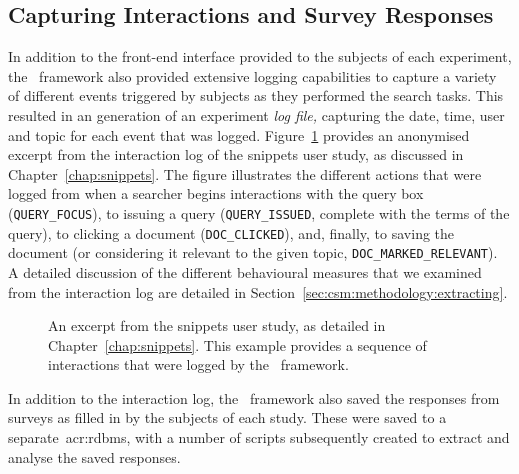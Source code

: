 \subsection{Capturing Interactions and Survey Responses}\label{sec:csm:methodology:user:capturing}
In addition to the front-end interface provided to the subjects of each experiment, the \treconomics~framework also provided extensive logging capabilities to capture a variety of different events triggered by subjects as they performed the search tasks. This resulted in an generation of an experiment \emph{log file,} capturing the date, time, user and topic for each event that was logged. Figure~\ref{fig:log} provides an anonymised excerpt from the interaction log of the snippets user study, as discussed in Chapter~\ref{chap:snippets}. The figure illustrates the different actions that were logged from when a searcher begins interactions with the query box (\texttt{QUERY\_FOCUS}), to issuing a query (\texttt{QUERY\_ISSUED}, complete with the terms of the query), to clicking a document (\texttt{DOC\_CLICKED}), and, finally, to saving the document (or considering it relevant to the given topic, \texttt{DOC\_MARKED\_RELEVANT}). A detailed discussion of the different behavioural measures that we examined from the interaction log are detailed in Section~\ref{sec:csm:methodology:extracting}.

\begin{figure}[t!]
    \centering
    \caption[Experiment log file excerpt]{An excerpt from the snippets user study, as detailed in Chapter~\ref{chap:snippets}. This example provides a sequence of interactions that were logged by the \treconomics~framework.}
    \label{fig:log}
\end{figure}

In addition to the interaction log, the \treconomics~framework also saved the responses from surveys as filled in by the subjects of each study. These were saved to a separate~\gls{acr:rdbms}, with a number of scripts subsequently created to extract and analyse the saved responses.

